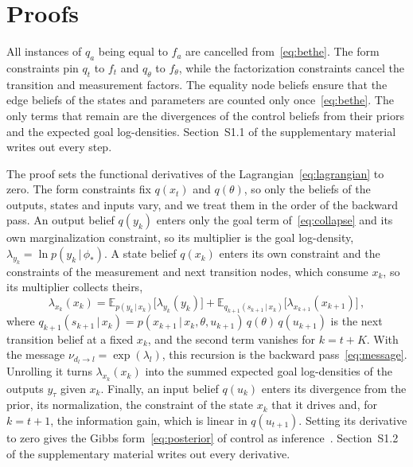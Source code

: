 \documentclass{l4dc2027}
\newcommand\given[1][]{\,#1\vert\,}
\newcommand{\E}{\mathbb{E}}
\newenvironment{proofof}[1]{\par\noindent{\bfseries\upshape Proof of #1\ }}{\jmlrQED}
\begin{document}
\appendix

\section{Proofs}\label{app:proofs}

\begin{proofof}{Lemma~\ref{lem:collapse}} \label{appx:bethe_collapse}
All instances of $q_a$ being equal to $f_a$ are cancelled from~\eqref{eq:bethe}. The form constraints pin $q_t$ to $f_t$ and $q_\theta$ to $f_\theta$, while the factorization constraints cancel the transition and measurement factors. The equality node beliefs ensure that the edge beliefs of the states and parameters are counted only once~\eqref{eq:bethe}. The only terms that remain are the divergences of the control beliefs from their priors and the expected goal log-densities. Section~S1.1 of the supplementary material writes out every step.
\end{proofof}

\begin{proofof}{Theorem~\ref{thm:posterior}} \label{appx:stationary}
The proof sets the functional derivatives of the Lagrangian~\eqref{eq:lagrangian} to zero. The form constraints fix $q(x_t)$ and $q(\theta)$, so only the beliefs of the outputs, states and inputs vary, and we treat them in the order of the backward pass. An output belief $q(y_k)$ enters only the goal term of~\eqref{eq:collapse} and its own marginalization constraint, so its multiplier is the goal log-density, $\lambda_{y_k} = \ln p(y_k \given \phi_*)$. A state belief $q(x_k)$ enters its own constraint and the constraints of the measurement and next transition nodes, which consume $x_k$, so its multiplier collects theirs,
\begin{equation}\label{eq:state-recursion}
	\lambda_{x_k}(x_k) = \E_{p(y_k \given x_k)}\big[\lambda_{y_k}(y_k)\big] + \E_{q_{k+1}(s_{k+1} \given x_k)}\big[\lambda_{x_{k+1}}(x_{k+1})\big] \, ,
\end{equation}
where $q_{k+1}(s_{k+1} \given x_k) = p(x_{k+1} \given x_k, \theta, u_{k+1})\, q(\theta)\, q(u_{k+1})$ is the next transition belief at a fixed $x_k$, and the second term vanishes for $k = t+K$. With the message $\nu_{d_l \to l} = \exp(\lambda_l)$, this recursion is the backward pass~\eqref{eq:message}. Unrolling it turns $\lambda_{x_k}(x_k)$ into the summed expected goal log-densities of the outputs $y_\tau$ given $x_k$. Finally, an input belief $q(u_k)$ enters its divergence from the prior, its normalization, the constraint of the state $x_k$ that it drives and, for $k = t+1$, the information gain, which is linear in $q(u_{t+1})$. Setting its derivative to zero gives the Gibbs form~\eqref{eq:posterior} of control as inference~\citep{levine2018reinforcement,wainwright2008graphical}. Section~S1.2 of the supplementary material writes out every derivative.
\end{proofof}
\end{document}
